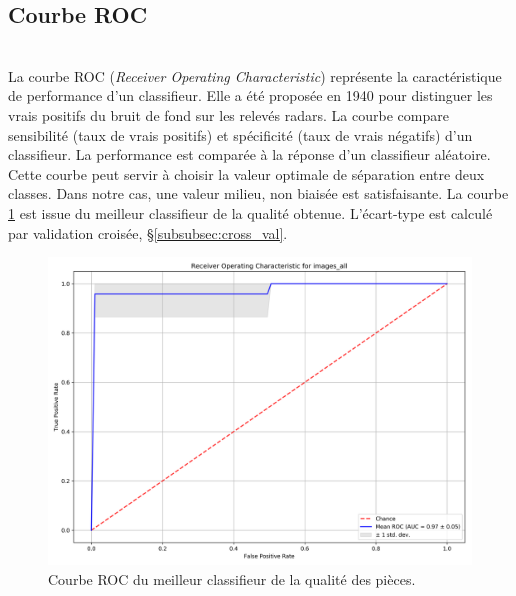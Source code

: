 \subsection{Courbe ROC}\mbox{} \\
La courbe ROC (\textit{Receiver Operating Characteristic}) représente la caractéristique de performance d'un classifieur.
Elle a été proposée en 1940 pour distinguer les vrais positifs du bruit de fond sur les relevés radars.
La courbe compare sensibilité (taux de vrais positifs) et spécificité (taux de vrais négatifs) d'un classifieur.
La performance est comparée à la réponse d'un classifieur aléatoire.
Cette courbe peut servir à choisir la valeur optimale de séparation entre deux classes.
Dans notre cas, une valeur milieu, non biaisée est satisfaisante.
La courbe \ref{fig:roc} est issue du meilleur classifieur de la qualité obtenue.
L'écart-type est calculé par validation croisée, §\ref{subsubsec:cross_val}.

\begin{figure}[hbtp]
	\centering
	\includegraphics[width=\textwidth,height=\textheight,keepaspectratio]{../Chap4/Figures/roc_images_all_224_3cams_densenet_conv4_PCA20.png}
	\caption{Courbe ROC du meilleur classifieur de la qualité des pièces.}
	\label{fig:roc}
\end{figure}


